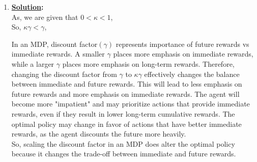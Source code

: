 \documentclass[12pt]{article}
\newcommand{\solution}{\noindent \textbf{\underline{Solution}: }}
\begin{document}
\begin{enumerate}
    \item \solution \\
    As, we are given that $0 < \kappa < 1$, \\ So, $ \kappa \gamma < \gamma $, 

    In an MDP, discount factor$(\gamma)$ represents importance of future rewards vs immediate rewards. 
    A smaller $\gamma$ places more emphasis on immediate rewards, while a larger $\gamma$ places more emphasis on long-term rewards. 
    Therefore, changing the discount factor from $\gamma$ to $\kappa \gamma $ effectively changes the balance between immediate and future rewards.
    This will lead to less emphasis on future rewards and more emphasis on immediate rewards.
    The agent will become more "impatient" and may prioritize actions that provide immediate rewards, even if they result in lower long-term cumulative rewards.
    The optimal policy may change in favor of actions that have better immediate rewards, as the agent discounts the future more heavily. \\
    So, scaling the discount factor in an MDP does alter the optimal policy because it changes the trade-off between immediate and future rewards.
\end{enumerate}

\end{document}
